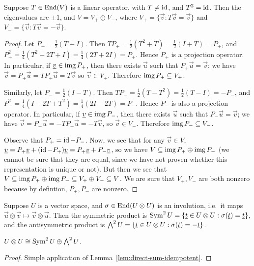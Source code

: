 \begin{lemma}\label{lem:direct-sum-idempotent}
    Suppose \(T \in \operatorname{End}(V)\) is a linear operator,
    with \(T \neq \operatorname{id}\), and \(T^2 = \operatorname{id}\).
    Then the eigenvalues are \(\pm 1\), and \(V = V_+ \oplus V_-\),
    where \(V_+ = \{\vec{v}: T\vec{v} = \vec{v}\}\)
    and \(V_- = \{\vec{v}: T\vec{v} = -\vec{v}\}\).
\end{lemma}
\begin{proof}
    Let \(P_+ = \frac{1}{2}(T+I)\).
    Then \(TP_+ = \frac{1}{2}(T^2+T) = \frac{1}{2}(I+T) = P_+\),
    and \(P_+^2 = \frac{1}{4}(T^2+2T+I) = \frac{1}{4}(2T+2I) = P_+\).
    Hence \(P_+\) is a projection operator.
    In particular, if \(\underline{v} \in \operatorname{img} P_+\),
    then there exists \(\vec{u}\) such that \(P_+\vec{u} = \vec{v}\);
    we have \(\vec{v} = P_+\vec{u} = TP_+\vec{u} = T\vec{v}\)
    so \(\vec{v} \in V_+\).
    Therefore \(\operatorname{img} P_+ \subseteq V_+\).

    Similarly, let \(P_- = \frac{1}{2}(I-T)\).
    Then \(TP_- = \frac{1}{2}(T-T^2) = \frac{1}{2}(T-I) = -P_-\),
    and \(P_-^2 = \frac{1}{4}(I-2T+T^2) = \frac{1}{4}(2I-2T) = P_-\).
    Hence \(P_-\) is also a projection operator.
    In particular, if \(\underline{v} \in \operatorname{img} P_-\),
    then there exists \(\vec{u}\) such that \(P_-\vec{u} = \vec{v}\);
    we have \(\vec{v} = P_-\vec{u} = -TP_-\vec{u} = -T\vec{v}\),
    so \(\vec{v} \in V_-\).
    Therefore \(\operatorname{img} P_- \subseteq V_-\).

    Observe that \(P_+ = \operatorname{id} - P_-\).
    Now, we see that for any \(\vec{v} \in V\),
    \(\underline{v} = P_+\underline{v} + (\operatorname{id} - P_+)\underline{v} = P_+\underline{v} + P_-\underline{v}\),
    so we have \(V \subseteq \operatorname{img} P_+ \oplus \operatorname{img} P_-\)
    (we cannot be sure that they are equal,
    since we have not proven whether this representation is unique or not).
    But then we see that
    \(V \subseteq \operatorname{img} P_+ \oplus \operatorname{img} P_- \subseteq V_+ \oplus V_- \subseteq V\).
    We are sure that \(V_+,V_-\) are both nonzero
    because by defintion, \(P_+,P_-\) are nonzero.
\end{proof}
\begin{definition}
    Suppose \(U\) is a vector space,
    and \(\sigma \in \operatorname{End}(U \otimes U)\) is an involution,
    i.e.\ it maps \(\vec{u}\otimes\vec{v} \mapsto \vec{v}\otimes\vec{u}\).
    Then the symmetric product is
    \(\operatorname{Sym}^2 U = \{\underline{t} \in U \otimes U: \sigma(\underline{t}) = \underline{t}\}\),
    and the antisymmetric product is
    \(\operatorname{{\bigwedge}}^2 U = \{\underline{t} \in U \otimes U: \sigma(\underline{t}) = -\underline{t}\}\).
\end{definition}
\begin{proposition}\label{prop:sum-sym-wedge}
    \(U \otimes U \cong \operatorname{Sym}^2 U \oplus \operatorname{{\bigwedge}}^2 U\).
\end{proposition}
\begin{proof}
    Simple application of Lemma~\ref*{lem:direct-sum-idempotent}.
\end{proof}

